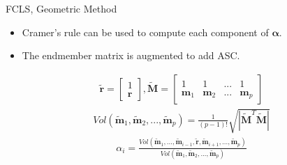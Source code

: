 \documentclass{beamer}
\begin{document}
\begin{frame}{FCLS, Geometric Method}
\begin{itemize}
\item Cramer's rule can be used to compute each component of \(\mathbf{\alpha}\).
\item The endmember matrix is augmented to add ASC.
\end{itemize}
\begin{align*}
\mathbf{\tilde{r}} = \begin{bmatrix}
1 \\ \mathbf{r}
\end{bmatrix},
\mathbf{\tilde{M}} =
\begin{bmatrix}
1 & 1 & ... & 1 \\
\mathbf{m}_1 & \mathbf{m}_2 & ... & \mathbf{m}_p
\end{bmatrix}
\end{align*}
\begin{align*}Vol(\mathbf{\tilde{m}}_1, \mathbf{\tilde{m}}_2, ..., \mathbf{\tilde{m}}_p) = \frac{1}{(p-1)!}\sqrt{|\mathbf{\tilde{M}}^T\mathbf{\tilde{M}}|}\end{align*}
\begin{align*}\alpha_i = \frac{Vol(\mathbf{\tilde{m}}_1, ..., \mathbf{\tilde{m}}_{i-1}, \mathbf{\tilde{r}}, \mathbf{\tilde{m}}_{i+1}, ..., \mathbf{\tilde{m}}_p)}{Vol(\mathbf{\tilde{m}}_1, \mathbf{\tilde{m}}_2, ..., \mathbf{\tilde{m}}_p)}\end{align*}
\end{frame}
\end{document}
